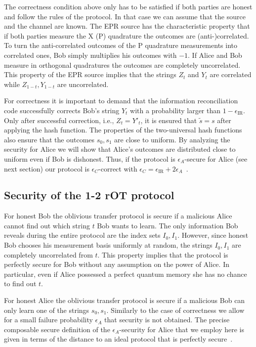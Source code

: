 \documentclass[aps,amsfonts,twoside,amssymb,superscriptaddress,twocolumn]{revtex4-1}
\newcommand*{\ec}{\textrm{IR}}
\begin{document}
The correctness condition above only has to be satisfied if both parties are honest and follow the rules of the protocol. 
In that case we can assume that the source and the channel are known. 
The EPR source has the characteristic property that if both parties measure the X (P) quadrature the outcomes are (anti-)correlated. 
To turn the anti-correlated outcomes of the P quadrature measurements into correlated ones, Bob simply multiplies his outcomes with $-1$. If Alice and Bob measure in orthogonal quadratures the outcomes are completely uncorrelated. 
This property of the EPR source implies that the strings $Z_t$ and $Y_t$ are correlated while $Z_{1-t},Y_{1-t}$ are uncorrelated.  

For correctness it is important to demand that the information reconciliation code successfully corrects Bob's string $Y_t$ with a probability larger than $1-\epsilon_{\ec}$. 
Only after successful correction, i.e., $Z_t = Y'_t$, it is ensured that $\tilde s = s$ after applying the hash function. 
The properties of the two-universal hash functions also ensure that the outcomes $s_0,s_1$ are close to uniform. 
By analyzing the security for Alice we will show that Alice's outcomes are distributed close to uniform even if Bob is dishonest.
Thus, if the protocol is $\epsilon_A$-secure for Alice (see next section) our protocol is $\epsilon_C$-correct with $\epsilon_C = \epsilon_{\ec} + 2 \epsilon_A$~\cite{Koenig2012,schaffner2010}. 


\subsection{Security of the 1-2 rOT protocol} 
\label{sec:security}

For honest Bob the oblivious transfer protocol is secure if a malicious Alice cannot find out which string $t$ Bob wants to learn. 
The only information Bob reveals during the entire protocol are the index sets $I_0,I_1$.
However, since honest Bob chooses his measurement basis uniformly at random, the strings $I_0,I_1$ are completely uncorrelated from $t$. 
This property implies that the protocol is perfectly secure for Bob without any assumption on the power of Alice. 
In particular, even if Alice possessed a perfect quantum memory she has no chance to find out $t$.

For honest Alice the oblivious transfer protocol is secure if a malicious Bob can only learn one of the strings $s_0,s_1$. 
Similarly to the case of correctness we allow for a small failure probability $\epsilon_A$ that security is not obtained. 
The precise composable secure definition of the $\epsilon_A$-security for Alice that we employ here is given in terms of the distance to an ideal protocol that is perfectly secure~\cite{Koenig2012}.
\end{document}
